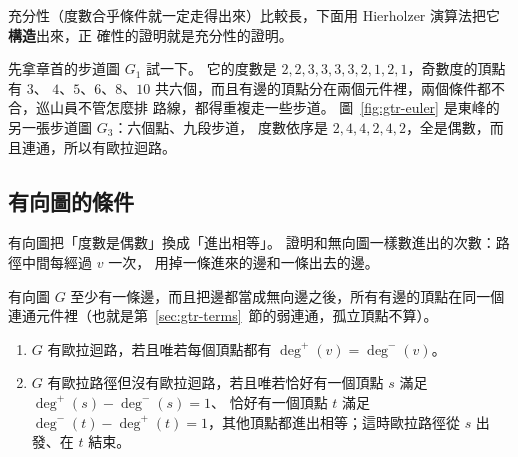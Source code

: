 充分性（度數合乎條件就一定走得出來）比較長，下面用 Hierholzer 演算法把它\textbf{構造}出來，正
確性的證明就是充分性的證明。

先拿章首的步道圖 $G_1$ 試一下。 它的度數是 $2, 2, 3, 3, 3, 3, 2, 1, 2, 1$，奇數度的頂點有 $3$、
$4$、$5$、$6$、$8$、$10$ 共六個，而且有邊的頂點分在兩個元件裡，兩個條件都不合，巡山員不管怎麼排
路線，都得重複走一些步道。 圖~\ref{fig:gtr-euler} 是東峰的另一張步道圖 $G_3$：六個點、九段步道，
度數依序是 $2, 4, 4, 2, 4, 2$，全是偶數，而且連通，所以有歐拉迴路。

\begin{center}
\label{fig:gtr-euler}
\end{center}

\subsection{有向圖的條件}

有向圖把「度數是偶數」換成「進出相等」。 證明和無向圖一樣數進出的次數：路徑中間每經過 $v$ 一次，
用掉一條進來的邊和一條出去的邊。

\begin{theorem}
\label{thm:gtr-euler-dir}
有向圖 $G$ 至少有一條邊，而且把邊都當成無向邊之後，所有有邊的頂點在同一個連通元件裡（也就是第~\ref{sec:gtr-terms}~節的弱連通，孤立頂點不算）。
\begin{enumerate}
\item $G$ 有歐拉迴路，若且唯若每個頂點都有 $\deg^{+}(v) = \deg^{-}(v)$。
\item $G$ 有歐拉路徑但沒有歐拉迴路，若且唯若恰好有一個頂點 $s$ 滿足 $\deg^{+}(s) - \deg^{-}(s) = 1$、
恰好有一個頂點 $t$ 滿足 $\deg^{-}(t) - \deg^{+}(t) = 1$，其他頂點都進出相等；這時歐拉路徑從
$s$ 出發、在 $t$ 結束。
\end{enumerate}
\end{theorem}

